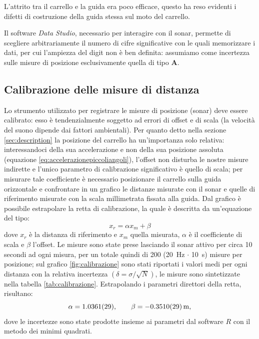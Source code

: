 \documentclass[10pt,oneside,a4paper]{article}
\begin{document}
L'attrito tra il carrello e la guida era poco efficace, questo ha reso evidenti i difetti di costruzione della guida stessa sul moto del carrello.

Il software \emph{Data Studio}, necessario per interagire con il sonar, permette di scegliere arbitrariamente il numero di cifre significative con le quali memorizzare i dati, per cui l'ampiezza del digit non è ben definita: assumiamo come incertezza sulle misure di posizione esclusivamente quella di tipo \textbf{A}.

\subsection{Calibrazione delle misure di distanza}
\label{subsec:Calibrazione}
Lo strumento utilizzato per registrare le misure di posizione (sonar) deve essere calibrato: esso è tendenzialmente soggetto ad errori di offset e di scala (la velocità del suono dipende dai fattori ambientali). Per quanto detto nella sezione \ref{sec:description} la posizione del carrello ha un'importanza solo relativa: interessandoci della sua accelerazione e non della sua posizione assoluta (equazione \ref{eq:accelerazionepiccoliangoli}), l'offset non disturba le nostre misure indirette e l'unico parametro di calibrazione significativo è quello di scala; per misurare tale coefficiente è necessario posizionare il carrello sulla guida orizzontale e confrontare in un grafico le distanze misurate con il sonar e quelle di riferimento misurate con la scala millimetrata fissata alla guida. Dal grafico è possibile estrapolare la retta di calibrazione, la quale è descritta da un'equazione del tipo:
\begin{equation}\label{eq:rettacalibrazione}
	x_{r}=\alpha x_{m} + \beta
\end{equation}
dove $x_r$ è la distanza di riferimento e $x_m$ quella misurata, $\alpha$ è il coefficiente di scala e $\beta$ l'offset. Le misure sono state prese lasciando il sonar attivo per circa 10 secondi ad ogni misura, per un totale quindi di 200 (\SI{20}{Hz} $\cdot$ \SI{10}{s}) misure per posizione; sul grafico \ref{fig:calibrazione} sono stati riportati i valori medi per ogni distanza con la relativa incertezza $( \delta = \sigma / \sqrt{N})$, le misure sono sintetizzate nella tabella \ref{tab:calibrazione}. Estrapolando i parametri direttori della retta, risultano:
\begin{equation}\label{eq:parametri_calibrazione}
	\alpha = \SI{ 1.0361 \pm 0.0029}{}, \qquad \beta = \SI{ -0.351 \pm 0.0029}{m}, %
\end{equation}
dove le incertezze sono state prodotte insieme ai parametri dal software $R$ con il metodo dei minimi quadrati.
\end{document}
